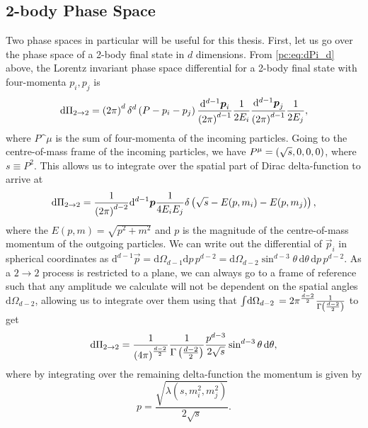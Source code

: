 \documentclass[../main.tex]{subfiles}
\begin{document}
\subsection{2-body Phase Space}
Two phase spaces in particular will be useful for this thesis.
First, let us go over the phase space of a 2-body final state in \(d\) dimensions.
From \cref{pc:eq:dPi_d} above, the Lorentz invariant phase space differential for a 2-body final state with
four-momenta \(p_i, p_j\) is
\begin{equation}
  \mathrm{d}\Pi_{2\to 2} = \left(2\pi\right)^d \delta^d\left(P - p_i -
    p_j\right) \frac{\mathrm{d}^{d-1} \boldsymbol{p}_i}{\left(2\pi\right)^{d-1}}
  \frac{1}{2E_i}
  \frac{\mathrm{d}^{d-1} \boldsymbol{p}_j}{\left(2\pi\right)^{d-1}} \frac{1}{2E_j},
\end{equation}
where \(P\^\mu\) is the sum of four-momenta of the incoming particles.
Going to the centre-of-mass frame of the incoming particles, we have \(P\^\mu =
\pclosed{\sqrt{s}, 0, 0, 0}\), where \(s \equiv P^2\).
This allows us to integrate over the spatial part of Dirac delta-function to arrive at
\begin{equation}
  \mathrm{d}\Pi_{2\to 2} = \frac{1}{\left(2\pi\right)^{d-2}}
  \mathrm{d}^{d-1} \boldsymbol{p} \frac{1}{4E_i E_j} \delta\left(\sqrt{s} -
    E(p, m_i)
    - E(p, m_j)\right),
\end{equation}
where the \(E(p, m) = \sqrt{p^2 + m^2}\) and \(p\) is the magnitude of the centre-of-mass momentum of the outgoing particles.
We can write out the differential of \(\vec{p}_i\) in
spherical coordinates as \(\mathrm{d}^{d-1} \vec{p} = \mathrm{d}\Omega_{d-1}
\mathrm{d}p \, p^{d-2} = \mathrm{d}\Omega_{d-2} \sin^{d-3}\theta \,
\mathrm{d}\theta \, \mathrm{d}p \, p^{d-2}\).
As a \(2\to 2\) process is restricted to a plane, we can always go to a
frame of reference such that any amplitude we calculate will not be dependent
on the spatial angles \(\mathrm{d} \Omega_{d-2}\), allowing us to integrate
over them using that \(\int \!\mathrm{d}\Omega_{d-2}\, = 2 \pi^{\frac{d-2}{2}}
\frac{1}{\Gamma\left(\frac{d-2}{2}\right)}\) to get
\begin{equation}
  \label{pc:eq:dPi_dtheta}
  \mathrm{d}\Pi_{2\to 2} = \frac{1}{\left(4\pi\right)^{\frac{d-2}{2}}}
  \frac{1}{\Gamma\left(\frac{d-2}{2}\right)} \frac{p^{d-3}}{2 \sqrt{s}}
  \sin^{d-3}\theta \,\mathrm{d}\theta,
\end{equation}
where by integrating over the remaining delta-function the momentum is given by
\begin{equation}
  \label{pc:eq:p}
  p = \frac{\sqrt{\lambda(s, m_i^2, m_j^2)}}{2\sqrt{s}}.
\end{equation}
\end{document}
